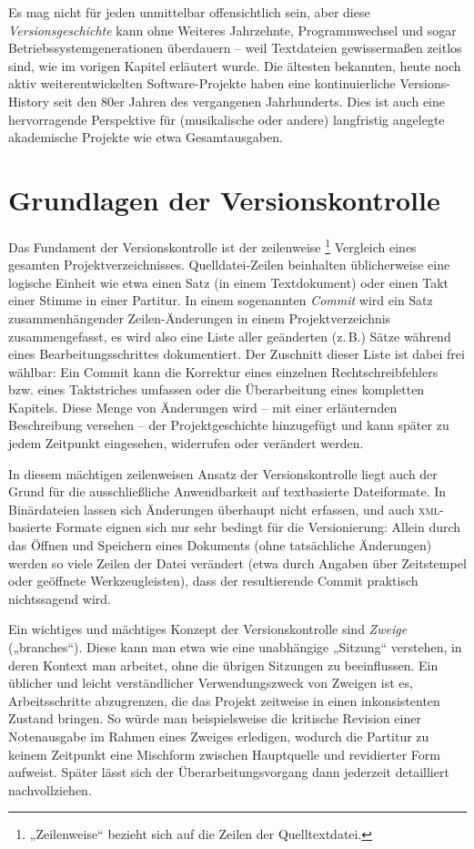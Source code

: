\documentclass[DIV=12]{scrreprt}
\begin{document}
Es mag nicht für jeden unmittelbar offensichtlich sein, aber diese \emph{Versionsgeschichte} kann ohne Weiteres Jahrzehnte, Programmwechsel und sogar Betriebssystemgenerationen überdauern -- weil Textdateien gewissermaßen zeitlos sind, wie im vorigen Kapitel erläutert wurde.
Die ältesten bekannten, heute noch aktiv weiterentwickelten Software-Projekte haben eine kontinuierliche Versions-History seit den 80er Jahren des vergangenen Jahrhunderts.
Dies ist auch eine hervorragende Perspektive für (musikalische oder andere) langfristig angelegte akademische Projekte wie etwa Gesamtausgaben.

\section{Grundlagen der Versionskontrolle}
\label{sec:pt_basics-version-control}
Das Fundament der Versionskontrolle ist der zeilenweise%
\footnote{„Zeilenweise“ bezieht sich auf die Zeilen der Quelltextdatei.}
Vergleich eines gesamten Projektverzeichnisses.
Quelldatei-Zeilen beinhalten üblicherweise eine logische Einheit wie etwa einen Satz (in einem Textdokument) oder einen Takt einer Stimme in einer Partitur.
In einem sogenannten \emph{Commit} wird ein Satz zusammenhängender Zeilen-Änderungen in 
einem Projektverzeichnis zusammengefasst, es wird also eine Liste aller geänderten (z.\,B.) Sätze während eines Bearbeitungsschrittes dokumentiert.
Der Zuschnitt dieser Liste ist dabei frei wählbar:
Ein Commit kann die Korrektur eines einzelnen Rechtschreibfehlers bzw. eines Taktstriches umfassen oder die Überarbeitung eines kompletten Kapitels.
Diese Menge von Änderungen wird -- mit einer erläuternden Beschreibung versehen -- der Projektgeschichte hinzugefügt und kann später zu jedem Zeitpunkt eingesehen, widerrufen oder verändert werden.

In diesem mächtigen zeilenweisen Ansatz der Versionskontrolle liegt auch der Grund für die ausschließliche Anwendbarkeit auf textbasierte Dateiformate.
In Binärdateien lassen sich Änderungen überhaupt nicht erfassen, und auch \textsc{xml}-basierte Formate eignen sich nur sehr bedingt für die Versionierung:
Allein durch das Öffnen und Speichern eines Dokuments (ohne tatsächliche Änderungen) werden so viele Zeilen der Datei verändert (etwa durch Angaben über Zeitstempel oder geöffnete Werkzeugleisten), dass der resultierende Commit praktisch nichtssagend wird.

Ein wichtiges und mächtiges Konzept der Versionskontrolle sind \emph{Zweige} („branches“).
Diese kann man etwa wie eine unabhängige „Sitzung“ verstehen, in deren Kontext man arbeitet, ohne die übrigen Sitzungen zu beeinflussen.
Ein üblicher und leicht verständlicher Verwendungszweck von Zweigen ist es, 
Arbeitsschritte abzugrenzen, die das Projekt zeitweise in einen inkonsistenten Zustand bringen.
So würde man beispielsweise die kritische Revision einer Notenausgabe im Rahmen eines Zweiges erledigen, wodurch die Partitur zu keinem Zeitpunkt eine Mischform zwischen Hauptquelle und revidierter Form aufweist.
Später lässt sich der Überarbeitungsvorgang dann jederzeit detailliert nachvollziehen.
\end{document}
